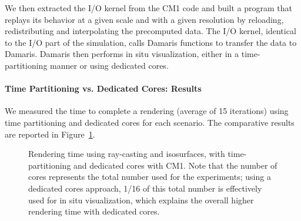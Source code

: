 We then extracted the I/O kernel 
from the CM1 code and built a program that replays its behavior at a given scale 
and with a given resolution by reloading, redistributing and interpolating the 
precomputed data.
The I/O kernel, identical to the I/O part of the simulation, calls Damaris
functions to transfer the data to Damaris. Damaris then performs in situ visualization, 
either in a time-partitioning manner or using dedicated cores.

\paragraph{Time Partitioning vs. Dedicated Cores: Results}
We measured the time to complete a rendering (average of 15 
iterations) using time partitioning and dedicated cores for each scenario. 
The comparative results are reported in Figure~\ref{fig:cm1vistime}.

\begin{figure}[t]
\centering
	\quad
	\caption[Rendering time of in situ ray-casting and isosurfaces of CM1]{Rendering time using ray-casting and isosurfaces, with 
	time-partitioning and dedicated cores with CM1. Note that the number of cores 
	represents the total number used for the experiments; using a dedicated cores 
	approach, 1/16 of this total number is effectively used for in situ visualization,
	which explains the overall higher rendering time with dedicated cores.}
	\label{fig:cm1vistime}
\end{figure}

